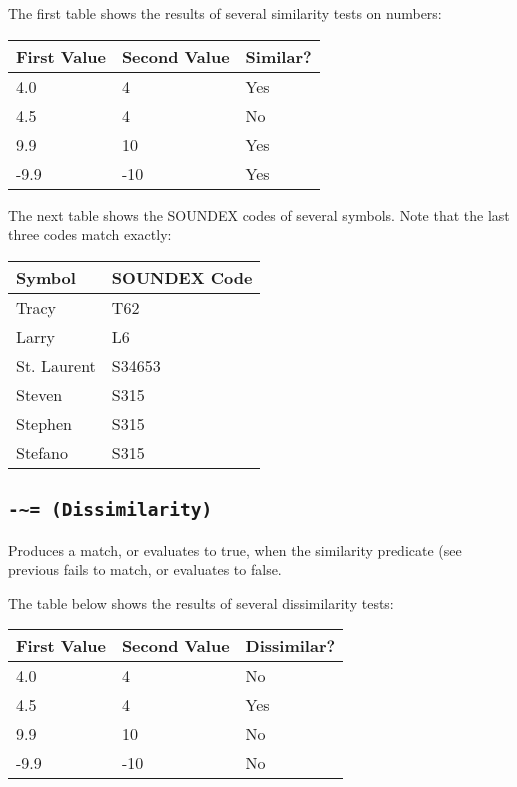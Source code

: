 \Example

The first table shows the results of several similarity tests on
numbers:

\begin{tabularx}{\columnwidth}{XXX}
  \toprule
  First Value & Second Value & Similar? \\
  \midrule
  4.0        & 4            & Yes \\
  4.5        & 4            & No \\
  9.9      & 10           & Yes \\
  -9.9     &   -10          & Yes \\
  \bottomrule
\end{tabularx}

The next table shows the SOUNDEX codes of several symbols.  Note that
the last three codes match exactly:

\begin{tabularx}{\columnwidth}{XX}
  \toprule
  Symbol      & SOUNDEX Code \\
  \midrule
  Tracy       & T62          \\
  Larry       & L6           \\
  St. Laurent & S34653       \\
  Steven      & S315         \\
  Stephen     & S315         \\
  Stefano     & S315         \\
  \bottomrule
\end{tabularx}

\subsection{\tt{-\~{}=} (Dissimilarity)}

Produces a match, or evaluates to true, when the similarity predicate
(see previous fails to match, or evaluates to false.

\Example

The table below shows the results of several dissimilarity tests:

\begin{tabularx}{\columnwidth}{XXX}
  \toprule
  First Value & Second Value & Dissimilar? \\
  \midrule
  4.0         & 4            & No          \\
  4.5         & 4            & Yes         \\
  9.9         & 10           & No          \\
  -9.9        & -10          & No          \\
  \bottomrule
\end{tabularx}


